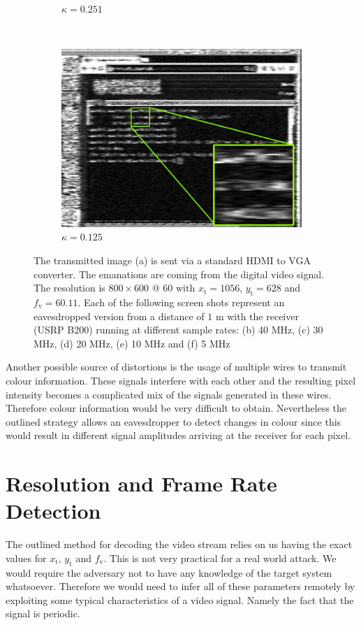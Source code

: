 \documentclass[a4paper,12pt,twoside,openright]{report}
\begin{document}
\begin{figure}[p!]
\begin{subfigure}[b]{0.45\textwidth}
  \caption{$\kappa = 0.251$}
\end{subfigure} ~
\begin{subfigure}[b]{0.45\textwidth}
  \includegraphics[width=\textwidth]{sr_5MHz_at_190MHz}
  \caption{$\kappa = 0.125$}
\end{subfigure}
\caption{The transmitted image (a) is sent via a standard HDMI to VGA converter. The emanations are coming from the digital video signal. The resolution is $800 \times 600 $ @ $ 60$ with $x_\text{t} = 1056$, $y_\text{t} = 628$ and $f_\text{v} = 60.11$. Each of the following screen shots represent an eavesdropped version from a distance of $1$ m with the receiver (USRP B200) running at different sample rates: (b) 40 MHz, (c) 30 MHz, (d) 20 MHz, (e) 10 MHz and (f) 5 MHz}
\label{fig:samplerates}
\end{figure}

Another possible source of distortions is the usage of multiple wires to transmit colour information. These signals interfere with each other and the resulting pixel intensity becomes a complicated mix of the signals generated in these wires. Therefore colour information would be very difficult to obtain. Nevertheless the outlined strategy allows an eavesdropper to detect changes in colour since this would result in different signal amplitudes arriving at the receiver for each pixel.

\section{Resolution and Frame Rate Detection}

The outlined method for decoding the video stream relies on us having the exact values for $x_\text{t}$, $y_\text{t}$ and $f_\text{v}$. This is not very practical for a real world attack. We would require the adversary not to have any knowledge of the target system whatsoever. Therefore we would need to infer all of these parameters remotely by exploiting some typical characteristics of a video signal. Namely the fact that the signal is periodic.
\end{document}

